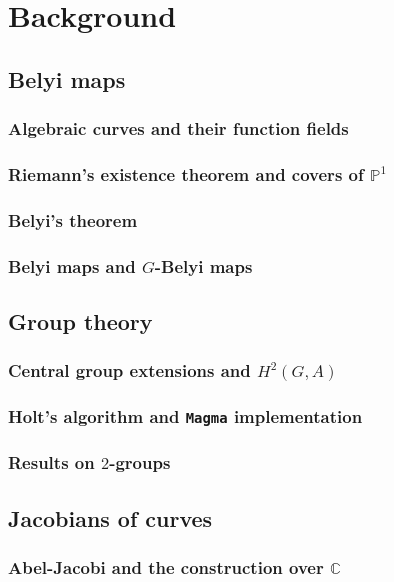 \documentclass{dcthesis}
\newcommand{\PP}{\mathbb P}
\newcommand{\CC}{\mathbb C}
\theoremstyle{definition}
\theoremstyle{remark}
\begin{document}
\chapter{Background}{\label{chapter:background}
  \section{Belyi maps}{\label{sec:belyimaps}
    \lipsum[1]
    \subsection{Algebraic curves and their function fields}{
      \lipsum[1]
    }
    \subsection{Riemann's existence theorem and covers of $\PP^1$}{
      \lipsum[1]
    }
    \subsection{Belyi's theorem}{
      \lipsum[1]
    }
    \subsection{Belyi maps and $G$-Belyi maps}{
      \lipsum[1]
    }
  }
  \section{Group theory}{
    \lipsum[1]
    \subsection{Central group extensions and $H^2(G,A)$}{
      \lipsum[1]
    }
    \subsection{Holt's algorithm and \texttt{Magma} implementation}{
      \lipsum[1]
    }
    \subsection{Results on $2$-groups}{
      \lipsum[1]
    }
  }
  \section{Jacobians of curves}{
    \lipsum[1]
    \subsection{Abel-Jacobi and the construction over $\CC$}{
      \lipsum[1]
    }
}}
\end{document}
